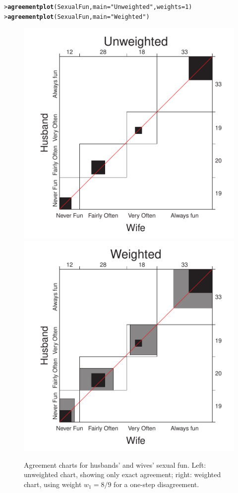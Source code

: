 \documentclass[10pt,krantz2]{krantz}\usepackage[]{graphicx}\usepackage[]{color}
\makeatletter
\newcommand{\hlnum}[1]{\textcolor[rgb]{0.686,0.059,0.569}{#1}}%
\newcommand{\hlstr}[1]{\textcolor[rgb]{0.192,0.494,0.8}{#1}}%
\newcommand{\hlstd}[1]{\textcolor[rgb]{0.345,0.345,0.345}{#1}}%
\newcommand{\hlkwc}[1]{\textcolor[rgb]{0.333,0.667,0.333}{#1}}%
\newcommand{\hlkwd}[1]{\textcolor[rgb]{0.737,0.353,0.396}{\textbf{#1}}}%
\newenvironment{kframe}{%
 \def\at@end@of@kframe{}%
 \ifinner\ifhmode%
  \def\at@end@of@kframe{\end{minipage}}%
  \begin{minipage}{\columnwidth}%
 \fi\fi%
 \def\FrameCommand##1{\hskip\@totalleftmargin \hskip-\fboxsep
 \colorbox{shadecolor}{##1}\hskip-\fboxsep
     \hskip-\linewidth \hskip-\@totalleftmargin \hskip\columnwidth}%
 \MakeFramed {\advance\hsize-\width
   \@totalleftmargin\z@ \linewidth\hsize
   \@setminipage}}%
 {\par\unskip\endMakeFramed%
 \at@end@of@kframe}
\newenvironment{knitrout}{}{} %
\renewenvironment{knitrout}{\small\renewcommand{\baselinestretch}{.85}}{} %
\makeatother
\begin{document}
\begin{knitrout}
\color{fgcolor}\begin{kframe}
\begin{alltt}
\hlstd{> }\hlkwd{agreementplot}\hlstd{(SexualFun,} \hlkwc{main} \hlstd{=} \hlstr{"Unweighted"}\hlstd{,} \hlkwc{weights} \hlstd{=} \hlnum{1}\hlstd{)}
\hlstd{> }\hlkwd{agreementplot}\hlstd{(SexualFun,} \hlkwc{main} \hlstd{=} \hlstr{"Weighted"}\hlstd{)}
\end{alltt}
\end{kframe}\begin{figure}[!htbp]

\centerline{\includegraphics[width=.48\textwidth]{ch04/fig/sexfun-agree-1} 
\includegraphics[width=.48\textwidth]{ch04/fig/sexfun-agree-2} }

\caption[Agreement charts for husbands' and wives' sexual fun]{Agreement charts for husbands' and wives' sexual fun. Left: unweighted chart, showing only exact agreement; right: weighted chart, using weight $w_1 = 8/9$ for a one-step disagreement.}\label{fig:sexfun-agree}
\end{figure}


\end{knitrout}
\end{document}
